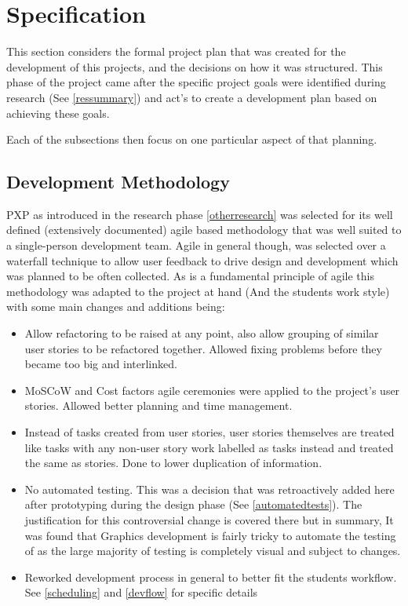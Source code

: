 \section{Specification}
This section considers the formal project plan that was created for the development of this projects, and the decisions on how it was structured. This phase of the project came after the specific project goals were identified during research (See \ref{ressummary}) and act's to create a development plan based on achieving these goals.

Each of the subsections then focus on one particular aspect of that planning.

\subsection{Development Methodology} \label{devmet}
PXP as introduced in the research phase \ref{otherresearch} was selected for its well defined (extensively documented) agile based methodology that was well suited to a single-person development team. Agile in general though, was selected over a waterfall technique to allow user feedback to drive design and development which was planned to be often collected.
As is a fundamental principle of agile this methodology was adapted to the project at hand (And the students work style) with some main changes and additions being:
\begin{itemize}
    \item Allow refactoring to be raised at any point, also allow grouping of similar user stories to be refactored together. Allowed fixing problems before they became too big and interlinked.
    \item MoSCoW and Cost factors agile ceremonies were applied to the project’s user stories. Allowed better planning and time management.
    \item Instead of tasks created from user stories, user stories themselves are treated like tasks with any non-user story work labelled as tasks instead and treated the same as stories. Done to lower duplication of information.
    \item No automated testing. This was a decision that was retroactively added here after prototyping during the design phase (See \ref{automatedtests}). The justification for this controversial change is covered there but in summary, It was found that Graphics development is fairly tricky to automate the testing of as the large majority of testing is completely visual and subject to changes.
    \item Reworked development process in general to better fit the students workflow. See \ref{scheduling} and \ref{devflow} for specific details
\end{itemize}

